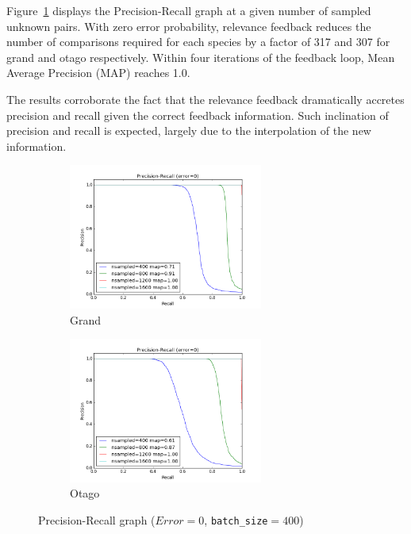 Figure~\ref{fig:pr_curves} displays the Precision-Recall graph at a given
number of sampled unknown pairs. With zero error probability, relevance
feedback reduces the number of comparisons required for each species by a
factor of 317 and 307 for grand and otago respectively. Within four iterations
of the feedback loop, Mean Average Precision (MAP) reaches 1.0.

The results corroborate the fact that the relevance feedback dramatically
accretes precision and recall given the correct feedback information. Such
inclination of precision and recall is expected, largely due to the
interpolation of the new information.

\begin{figure}[htbp]
  \centering
  \begin{subfigure}[t]{\textwidth}
      \centering
      \includegraphics[width=0.7\textwidth]{pr/grand}
      \caption{Grand}
  \end{subfigure}%

  \begin{subfigure}[t]{\textwidth}
      \centering
      \includegraphics[width=0.7\textwidth]{pr/otago}
      \caption{Otago}
  \end{subfigure}%
  \captionsetup{justification=centering}
  \caption{Precision-Recall graph ($Error=0$, \texttt{batch\_size}$=400$)}
  \label{fig:pr_curves} %
\end{figure}

